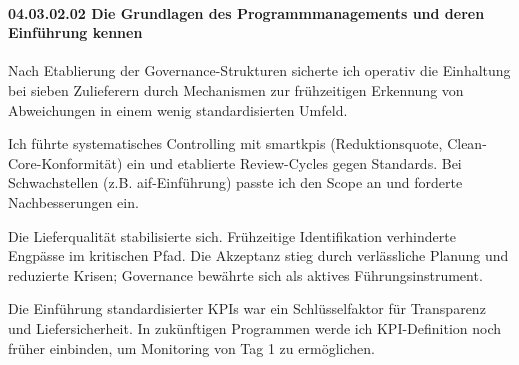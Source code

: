 \paragraph*{04.03.02.02 Die Grundlagen des Programmmanagements und deren Einführung kennen}
\label{para:04.03.02.02_GrundlagenProgrammmanagement}

\par Nach Etablierung der Governance-Strukturen sicherte ich operativ die Einhaltung bei sieben Zulieferern durch Mechanismen zur frühzeitigen Erkennung von Abweichungen in einem wenig standardisierten Umfeld.

\par Ich führte systematisches Controlling mit \glspl{smartkpi} (Reduktionsquote, Clean-Core-Konformität) ein und etablierte Review-Cycles gegen Standards. Bei Schwachstellen (z.B. \gls{aif}-Einführung) passte ich den Scope an und forderte Nachbesserungen ein.

\par Die Lieferqualität stabilisierte sich. Frühzeitige Identifikation verhinderte Engpässe im kritischen Pfad. Die Akzeptanz stieg durch verlässliche Planung und reduzierte Krisen; Governance bewährte sich als aktives Führungsinstrument.

\par Die Einführung standardisierter KPIs war ein Schlüsselfaktor für Transparenz und Liefersicherheit. In zukünftigen Programmen werde ich KPI-Definition noch früher einbinden, um Monitoring von Tag 1 zu ermöglichen.
